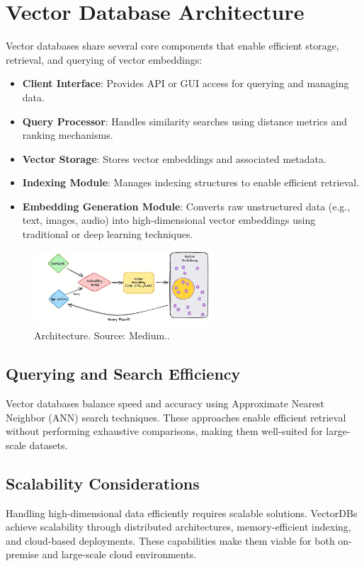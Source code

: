 \section{Vector Database Architecture}  

Vector databases share several core components that enable efficient storage, retrieval, and querying of vector embeddings:  

\begin{itemize}  
    \item \textbf{Client Interface}: Provides API or GUI access for querying and managing data.  
    \item \textbf{Query Processor}: Handles similarity searches using distance metrics and ranking mechanisms.  
    \item \textbf{Vector Storage}: Stores vector embeddings and associated metadata.  
    \item \textbf{Indexing Module}: Manages indexing structures to enable efficient retrieval.  
    \item \textbf{Embedding Generation Module}: Converts raw unstructured data (e.g., text, images, audio) into high-dimensional vector embeddings using traditional or deep learning techniques.  
\end{itemize}  
\begin{figure}[h]
    \centering
    \includegraphics[width=0.6\textwidth]{IMAGES/immagine_2025-02-24_100130378.png}
    \caption[VDB Architecture.]{Architecture. Source: Medium.\footnotemark.}
    \label{fig:Architecture}
\end{figure}
\subsection{Querying and Search Efficiency}  
Vector databases balance speed and accuracy using Approximate Nearest Neighbor (ANN) search techniques. These approaches enable efficient retrieval without performing exhaustive comparisons, making them well-suited for large-scale datasets.  

\subsection{Scalability Considerations}  
Handling high-dimensional data efficiently requires scalable solutions. VectorDBs achieve scalability through distributed architectures, memory-efficient indexing, and cloud-based deployments. These capabilities make them viable for both on-premise and large-scale cloud environments.  








